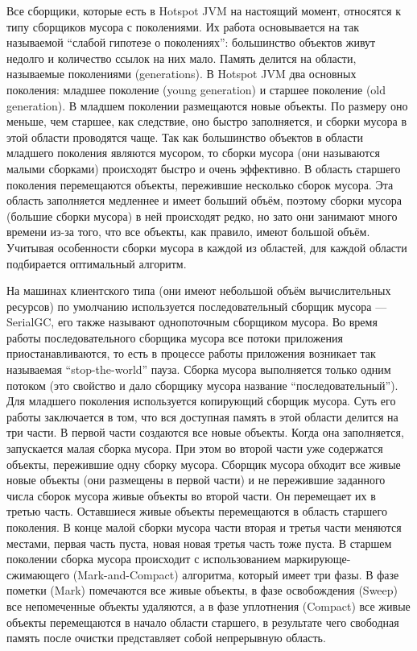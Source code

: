 \documentclass[12pt,a4paper]{article}
\begin{document}
Все сборщики, которые есть в Hotspot JVM на настоящий момент, относятся к типу сборщиков мусора
с поколениями. Их работа основывается на так называемой ``слабой гипотезе о поколениях'':
большинство объектов живут недолго и количество ссылок на них мало. Память делится на области, называемые
поколениями (generations). В Hotspot JVM два основных поколения: младшее поколение (young generation)
и старшее поколение (old generation).
В младшем поколении размещаются новые объекты. По размеру оно меньше, чем 
старшее, как следствие, оно быстро заполняется, и сборки мусора в этой
области проводятся чаще. Так как большинство объектов в области младшего поколения
являются мусором, то сборки мусора
(они называются малыми сборками) происходят быстро и очень эффективно. В область старшего поколения
перемещаются объекты,
пережившие несколько сборок мусора. Эта область заполняется медленнее и имеет больший объём,
поэтому сборки мусора (большие сборки мусора) в ней происходят редко, но зато они занимают
много времени из-за того,
что все объекты, как правило, имеют большой объём. Учитывая особенности сборки мусора 
в каждой из областей, для каждой области подбирается оптимальный алгоритм.

На машинах клиентского типа (они имеют небольшой объём вычислительных ресурсов) по
умолчанию используется последовательный сборщик мусора --- SerialGC, его также 
называют однопоточным сборщиком мусора. Во время работы последовательного сборщика
мусора все потоки приложения приостанавливаются, то есть в процессе работы приложения
возникает так называемая ``stop-the-world'' пауза. Сборка мусора выполняется только 
одним потоком (это свойство и дало сборщику мусора название ``последовательный'').
Для младшего поколения используется копирующий сборщик мусора. Суть его работы заключается
в том, что вся доступная память в этой области делится на три части.
В первой части создаются все новые объекты. Когда она заполняется,
запускается малая сборка мусора.
При этом во второй части уже содержатся объекты, пережившие
одну сборку мусора. Сборщик мусора обходит все живые новые объекты (они размещены в первой части) и не пережившие заданного числа сборок мусора 
живые объекты во второй части. Он перемещает их в третью часть.
Оставшиеся живые объекты перемещаются в область старшего поколения. В конце малой сборки мусора
части вторая и третья части меняются местами, первая часть пуста, новая 
новая третья часть тоже пуста. В старшем поколении сборка мусора происходит с использованием 
маркирующе-сжимающего
(Mark-and-Compact) алгоритма, который имеет три фазы. В фазе пометки (Mark) помечаются
все живые объекты, в фазе освобождения (Sweep) все непомеченные объекты удаляются, 
а в фазе уплотнения (Compact) все живые объекты перемещаются в начало области старшего, 
в результате чего свободная память после очистки представляет собой непрерывную область. 
\end{document}
